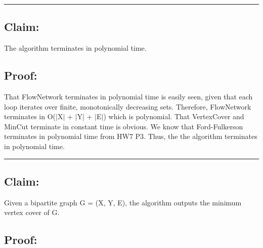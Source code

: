 \documentclass[11pt]{article}
\begin{document}
\noindent\textcolor[RGB]{220,220,220}{\rule{\linewidth}{0.8pt}}
\linebreak

\subsection*{Claim:} 

The algorithm terminates in polynomial time. 

\subsection*{Proof:} 

That FlowNetwork terminates in polynomial time is easily seen, given that each loop iterates over finite, monotonically decreasing sets. Therefore, FlowNetwork terminates in O($|$X$|$ + $|$Y$|$ + $|$E$|$) which is polynomial. That VertexCover and MinCut terminate in constant time is obvious. We know that Ford-Fulkerson terminates in polynomial time from HW7 P3. Thus, the the algorithm terminates in polynomial time. 

\noindent\textcolor[RGB]{220,220,220}{\rule{\linewidth}{0.8pt}}

\subsection*{Claim:} 

Given a bipartite graph G = (X, Y, E), the algorithm outputs the minimum vertex cover of G. 

\subsection*{Proof:}
\end{document}
